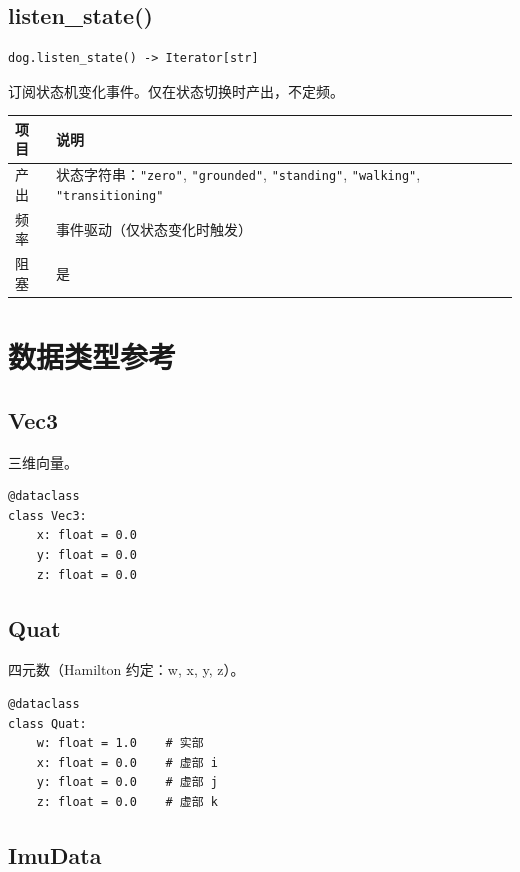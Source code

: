 \documentclass[a4paper,11pt,openany]{book}
\begin{document}
\subsection{listen\_state()}

\begin{lstlisting}[style=python,numbers=none]
dog.listen_state() -> Iterator[str]
\end{lstlisting}

订阅状态机变化事件。仅在状态切换时产出，不定频。

\begin{longtable}{ll}
\toprule
项目 & 说明 \\
\midrule
\endhead
产出 & 状态字符串：\texttt{"zero"}, \texttt{"grounded"}, \texttt{"standing"}, \texttt{"walking"}, \texttt{"transitioning"} \\
频率 & 事件驱动（仅状态变化时触发） \\
阻塞 & 是 \\
\bottomrule
\end{longtable}

\section{数据类型参考}

\subsection{Vec3}

三维向量。

\begin{lstlisting}[style=python]
@dataclass
class Vec3:
    x: float = 0.0
    y: float = 0.0
    z: float = 0.0
\end{lstlisting}

\subsection{Quat}

四元数（Hamilton 约定：w, x, y, z）。

\begin{lstlisting}[style=python]
@dataclass
class Quat:
    w: float = 1.0    # 实部
    x: float = 0.0    # 虚部 i
    y: float = 0.0    # 虚部 j
    z: float = 0.0    # 虚部 k
\end{lstlisting}

\subsection{ImuData}
\end{document}
